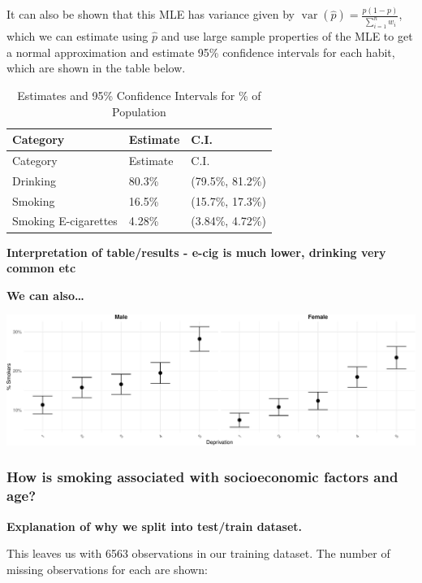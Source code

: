 \documentclass[
  11pt,
]{article}
\begin{document}
It can also be shown that this MLE has variance given by
\(\mathop{\mathrm{var}}(\widehat{p})=\frac{p(1-p)}{\sum_{i=1}^{n}w_i}\),
which we can estimate using \(\widehat{p}\) and use large sample
properties of the MLE to get a normal approximation and estimate 95\%
confidence intervals for each habit, which are shown in the table below.

\begin{longtable}[]{@{}lll@{}}
\caption{Estimates and 95\% Confidence Intervals for \% of
Population}\tabularnewline
\toprule\noalign{}
Category & Estimate & C.I. \\
\midrule\noalign{}
\endfirsthead
\toprule\noalign{}
Category & Estimate & C.I. \\
\midrule\noalign{}
\endhead
\bottomrule\noalign{}
\endlastfoot
Drinking & 80.3\% & (79.5\%, 81.2\%) \\
Smoking & 16.5\% & (15.7\%, 17.3\%) \\
Smoking E-cigarettes & 4.28\% & (3.84\%, 4.72\%) \\
\end{longtable}

\textbf{Interpretation of table/results - e-cig is much lower, drinking
very common etc}

\textbf{We can also\ldots{}}

\includegraphics{Coursework_files/figure-latex/output prevelance plot-1.pdf}\\

\subsubsection{How is smoking associated with socioeconomic factors and
age?}\label{how-is-smoking-associated-with-socioeconomic-factors-and-age}

\textbf{Explanation of why we split into test/train dataset.}

This leaves us with 6563 observations in our training dataset. The
number of missing observations for each are shown:
\end{document}
